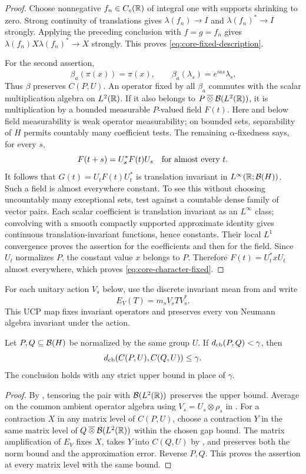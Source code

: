 \begin{proof}
Choose nonnegative $f_n\in C_c(\mathbb R)$ of integral one with supports
shrinking to zero.  Strong continuity of translations gives
$\lambda(f_n)\to I$ and $\lambda(f_n)^*\to I$ strongly.  Applying the
preceding conclusion with $f=g=f_n$ gives
$\lambda(f_n)X\lambda(f_n)^*\to X$ strongly.  This proves
\eqref{eq:core-fixed-description}.

For the second assertion,
\[
 \beta_a(\pi(x))=\pi(x),\qquad
 \beta_a(\lambda_s)=e^{ias}\lambda_s.
\]
Thus $\beta$ preserves $C(P,U)$.  An operator fixed by all $\beta_a$
commutes with the scalar multiplication algebra on $L^2(\mathbb R)$.
If it also belongs to $P\mathbin{\overline\otimes}\mathcal B(L^2(\mathbb R))$, it is multiplication
by a bounded measurable $P$-valued field $F(t)$.  Here and below field
measurability is weak operator measurability; on bounded sets,
separability of $H$ permits countably many coefficient tests.
The remaining $\alpha$-fixedness says, for every $s$,
\[
 F(t+s)=U_s^*F(t)U_s\quad\hbox{for almost every }t.
\]
It follows that $G(t)=U_tF(t)U_t^*$ is translation invariant in
$L^\infty(\mathbb R;\mathcal B(H))$.  Such a field is almost everywhere constant.
To see this without choosing uncountably many exceptional sets, test
against a countable dense family of vector pairs.  Each scalar
coefficient is translation invariant as an $L^\infty$ class; convolving
with a smooth compactly supported approximate identity gives continuous
translation-invariant functions, hence constants.  Their local
$L^1$ convergence proves the assertion for the coefficients and then
for the field.  Since $U_t$ normalizes $P$, the constant value $x$
belongs to $P$.  Therefore $F(t)=U_t^*xU_t$ almost everywhere,
which proves \eqref{eq:core-character-fixed}.
\end{proof}

For each unitary action $V_s$ below, use the discrete invariant
mean from  and write
\[
 E_V(T)=m_sV_sTV_s^*.
\]
This UCP map fixes invariant operators and preserves every von
Neumann algebra invariant under the action.

\begin{lemma}
\label{lem:core-gap}
Let $P,Q\subseteq\mathcal B(H)$ be normalized by the same group $U$.
If $d_{\mathrm{cb}}(P,Q)<\gamma$, then
\[
 d_{\mathrm{cb}}(C(P,U),C(Q,U))\le\gamma.
\]
The conclusion holds with any strict upper bound in place of $\gamma$.
\end{lemma}

\begin{proof}
By , tensoring the pair with
$\mathcal B(L^2(\mathbb R))$ preserves the upper bound.  Average on the common ambient
operator algebra using $V_s=U_s\otimes\rho_s$ in
.
For a contraction $X$ in any matrix level of $C(P,U)$, choose a
contraction $Y$ in the same matrix level of
$Q\mathbin{\overline\otimes}\mathcal B(L^2(\mathbb R))$ within the chosen gap bound.  The matrix
amplification of $E_V$ fixes $X$, takes $Y$ into $C(Q,U)$ by
, and preserves both the norm bound and
the approximation error.  Reverse $P,Q$.  This proves the assertion
at every matrix level with the same bound.
\end{proof}

